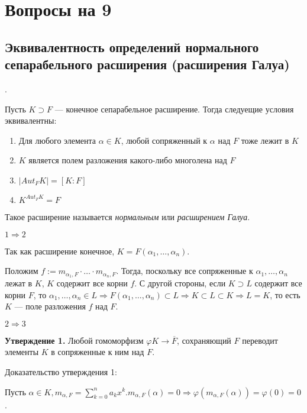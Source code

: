 \documentclass[../main.tex]{subfiles}
\begin{document}
\section{Вопросы на 9}

    \hypertarget{9.1}{\subsection{Эквивалентность определений нормального сепарабельного расширения
    (расширения Галуа)}}.

    Пусть $K \supset F$ --- конечное сепарабельное расширение.
    Тогда следуещие условия эквивалентны:

    \begin{enumerate}
        \item Для любого элемента $\alpha \in K$, любой сопряженный к $\alpha$
        над $F$ тоже лежит в $K$

        \item $K$ является полем разложения какого-либо многолена над $F$

        \item $|Aut_FK| = [K : F]$

        \item $K^{Aut_FK} = F$
    \end{enumerate}

    Такое расширение называется \textit{нормальным}
    или \textit{расширением Галуа}.

    $1 \Rightarrow 2$

    Так как расширение конечное, $K = F(\alpha_1, \ldots, \alpha_n)$.

    Положим $f := m_{\alpha_1, F} \cdot \ldots \cdot m_{\alpha_n, F}$.
    Тогда, поскольку все сопряженные к $\alpha_1, \ldots, \alpha_n$
    лежат в $K$, $K$ содержит все корни $f$. С другой стороны, если
    $K \supset L$ содержит все корни $F$, то $\alpha_1, \ldots, \alpha_n
    \in L \Rightarrow F(\alpha_1, \ldots, \alpha_n) \subset L \Rightarrow
    K \subset L \subset K \Rightarrow L = K$,
    то есть $K$ --- поле разложения $f$ над $F$.

    $2 \Rightarrow 3$

    \textbf{Утверждение 1.} Любой гомоморфизм $\varphi K \to \overline{F}$,
    сохраняющий $F$ переводит элементы $K$ в сопряженные к ним над $F$.

    Доказательство утверждения 1:

    Пусть $\alpha \in K, m_{\alpha, F} = \sum\limits_{k=0}^n a_kx^k.
    m_{\alpha, F}(\alpha) = 0 \Rightarrow \varphi(m_{\alpha, F}(\alpha))
    = \varphi(0) = 0$.
\end{document}
